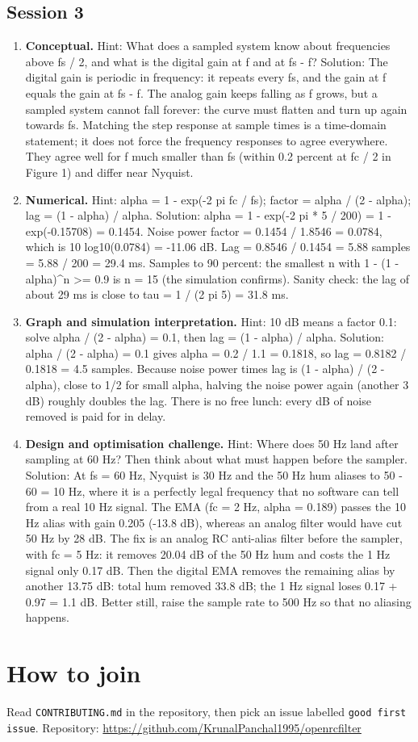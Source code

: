 \documentclass[11pt,a4paper]{article}
\begin{document}
\subsection*{Session 3}
\begin{enumerate}[nosep]
\item \textbf{Conceptual.} Hint: What does a sampled system know about frequencies above fs / 2, and what is the digital gain at f and at fs - f? Solution: The digital gain is periodic in frequency: it repeats every fs, and the gain at f equals the gain at fs - f. The analog gain keeps falling as f grows, but a sampled system cannot fall forever: the curve must flatten and turn up again towards fs. Matching the step response at sample times is a time-domain statement; it does not force the frequency responses to agree everywhere. They agree well for f much smaller than fs (within 0.2 percent at fc / 2 in Figure 1) and differ near Nyquist.
\item \textbf{Numerical.} Hint: alpha = 1 - exp(-2 pi fc / fs); factor = alpha / (2 - alpha); lag = (1 - alpha) / alpha. Solution: alpha = 1 - exp(-2 pi * 5 / 200) = 1 - exp(-0.15708) = 0.1454. Noise power factor = 0.1454 / 1.8546 = 0.0784, which is 10 log10(0.0784) = -11.06 dB. Lag = 0.8546 / 0.1454 = 5.88 samples = 5.88 / 200 = 29.4 ms. Samples to 90 percent: the smallest n with 1 - (1 - alpha)\textasciicircum{}n \textgreater{}= 0.9 is n = 15 (the simulation confirms). Sanity check: the lag of about 29 ms is close to tau = 1 / (2 pi 5) = 31.8 ms.
\item \textbf{Graph and simulation interpretation.} Hint: 10 dB means a factor 0.1: solve alpha / (2 - alpha) = 0.1, then lag = (1 - alpha) / alpha. Solution: alpha / (2 - alpha) = 0.1 gives alpha = 0.2 / 1.1 = 0.1818, so lag = 0.8182 / 0.1818 = 4.5 samples. Because noise power times lag is (1 - alpha) / (2 - alpha), close to 1/2 for small alpha, halving the noise power again (another 3 dB) roughly doubles the lag. There is no free lunch: every dB of noise removed is paid for in delay.
\item \textbf{Design and optimisation challenge.} Hint: Where does 50 Hz land after sampling at 60 Hz? Then think about what must happen before the sampler. Solution: At fs = 60 Hz, Nyquist is 30 Hz and the 50 Hz hum aliases to \textbar{}50 - 60\textbar{} = 10 Hz, where it is a perfectly legal frequency that no software can tell from a real 10 Hz signal. The EMA (fc = 2 Hz, alpha = 0.189) passes the 10 Hz alias with gain 0.205 (-13.8 dB), whereas an analog filter would have cut 50 Hz by 28 dB. The fix is an analog RC anti-alias filter before the sampler, with fc = 5 Hz: it removes 20.04 dB of the 50 Hz hum and costs the 1 Hz signal only 0.17 dB. Then the digital EMA removes the remaining alias by another 13.75 dB: total hum removed 33.8 dB; the 1 Hz signal loses 0.17 + 0.97 = 1.1 dB. Better still, raise the sample rate to 500 Hz so that no aliasing happens.
\end{enumerate}

\section{How to join}
Read \texttt{CONTRIBUTING.md} in the repository, then pick an issue labelled \texttt{good first issue}. Repository: \url{https://github.com/KrunalPanchal1995/openrcfilter}
\end{document}

